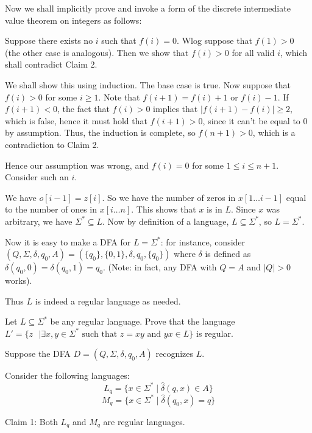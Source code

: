 \documentclass[answers]{exam}
\newcommand{\hd}{\hat{\delta}}
\begin{document}
\begin{questions}
\begin{solution}
        Now we shall implicitly prove and invoke a form of the discrete intermediate value theorem on integers as follows:

        Suppose there exists no $i$ such that $f(i) = 0$. Wlog suppose that $f(1) > 0$ (the other case is analogous). Then we show that $f(i) > 0$ for all valid $i$, which shall contradict Claim 2.

        We shall show this using induction. The base case is true. Now suppose that $f(i) > 0$ for some $i \ge 1$. Note that $f(i + 1) = f(i) + 1$ or $f(i) - 1$. If $f(i + 1) < 0$, the fact that $f(i)
        > 0$ implies that $|f(i + 1) - f(i)| \ge 2$, which is false, hence it must hold that $f(i + 1) > 0$, since it can't be equal to $0$ by assumption. Thus, the induction is complete, so $f(n + 1)
        > 0$, which is a contradiction to Claim 2.

        Hence our assumption was wrong, and $f(i) = 0$ for some $1 \le i \le n + 1$. Consider such an $i$.

        We have $o[i - 1] = z[i]$. So we have the number of zeros in $x[1 \ldots i - 1]$ equal to the number of ones in $x[i \ldots n]$. This shows that $x$ is in $L$. Since $x$ was arbitrary, we have
        $\Sigma^* \subseteq L$. Now by definition of a language, $L \subseteq \Sigma^*$, so $L = \Sigma^*$.

        Now it is easy to make a DFA for $L = \Sigma^*$: for instance, consider $(Q, \Sigma, \delta, q_0, A) = (\{q_0\}, \{0, 1\}, \delta, q_0, \{q_0\})$ where $\delta$ is defined as $\delta(q_0, 0)
        = \delta(q_0, 1) = q_0$. (Note: in fact, any DFA with $Q = A$ and $|Q| > 0$ works).

        Thus $L$ is indeed a regular language as needed.
    \end{solution}

    \question[6]
    Let $L\subseteq\Sigma^*$ be any regular language. Prove that the language $L'=\{z\text{ }|\exists x,y\in\Sigma^*\text{ such that }z=xy\text{ and }yx\in L\}$ is regular.

    \begin{solution}
        Suppose the DFA $D = (Q, \Sigma, \delta, q_0, A)$ recognizes $L$.

        Consider the following languages:
        \[
            L_q = \{x \in \Sigma^* \mid \hd(q, x) \in A\}
        \]
        \[
            M_q = \{x \in \Sigma^* \mid \hd(q_0, x) = q\}
        \]

        Claim 1: Both $L_q$ and $M_q$ are regular languages.


\end{solution}
\end{questions}
\end{document}
